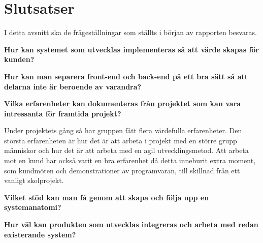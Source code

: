 \chapter{Slutsatser}
I detta avsnitt ska de frågeställningar som ställts i början av rapporten besvaras.

\textbf{Hur kan systemet som utvecklas implementeras så att värde skapas för kunden?}

\textbf{Hur kan man separera front-end och back-end på ett bra sätt så att delarna inte är beroende av varandra?}

\textbf{Vilka erfarenheter kan dokumenteras från projektet som kan vara intressanta för framtida projekt?}

Under projektets gång så har gruppen fått flera värdefulla erfarenheter. Den största erfarenheten är hur det är att arbeta i projekt med en större grupp människor och hur det är att arbeta med en agil utvecklingsmetod. Att arbeta mot en kund har också varit en bra erfarenhet då detta inneburit extra moment, som kundmöten och demonstrationer av programvaran, till skillnad från ett vanligt skolprojekt.

\textbf{Vilket stöd kan man få genom att skapa och följa upp en systemanatomi?}

\textbf{Hur väl kan produkten som utvecklas integreras och arbeta med redan existerande system?}